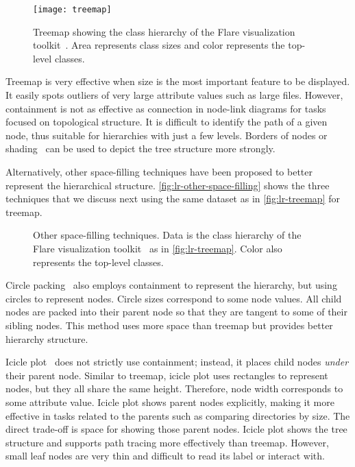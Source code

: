 \begin{figure}[!htb]
	\centering
	\texttt{[image: treemap]}
	\caption{Treemap showing the class hierarchy of the Flare visualization toolkit~\cite{Heer2009b}. Area represents class sizes and color represents the top-level classes.}
	\label{fig:lr-treemap}
\end{figure}

Treemap is very effective when size is the most important feature to be displayed. It easily spots outliers of very large attribute values such as large files. However, containment is not as effective as connection in node-link diagrams for tasks focused on topological structure. It is difficult to identify the path of a given node, thus suitable for hierarchies with just a few levels. Borders of nodes or shading~\cite{Wijk1999} can be used to depict the tree structure more strongly.

Alternatively, other space-filling techniques have been proposed to better represent the hierarchical structure. \autoref{fig:lr-other-space-filling} shows the three techniques that we discuss next using the same dataset as in \autoref{fig:lr-treemap} for treemap. 

\begin{figure}[!htb]
	\centering
	\hfill
	
	\vspace{.5\baselineskip}
	
	\caption{Other space-filling techniques. Data is the class hierarchy of the Flare visualization toolkit~\cite{Heer2009b} as in \autoref{fig:lr-treemap}. Color also represents the top-level classes.}
	\label{fig:lr-other-space-filling}
\end{figure}

Circle packing~\cite{Wang2006} also employs containment to represent the hierarchy, but using circles to represent nodes. Circle sizes correspond to some node values. All child nodes are packed into their parent node so that they are tangent to some of their sibling nodes. This method uses more space than treemap but provides better hierarchy structure.

Icicle plot~\cite{Kruskal1983} does not strictly use containment; instead, it places child nodes \emph{under} their parent node. Similar to treemap, icicle plot uses rectangles to represent nodes, but they all share the same height. Therefore, node width corresponds to some attribute value. Icicle plot shows parent nodes explicitly, making it more effective in tasks related to the parents such as comparing directories by size. The direct trade-off is space for showing those parent nodes. Icicle plot shows the tree structure and supports path tracing more effectively than treemap. However, small leaf nodes are very thin and difficult to read its label or interact with.

